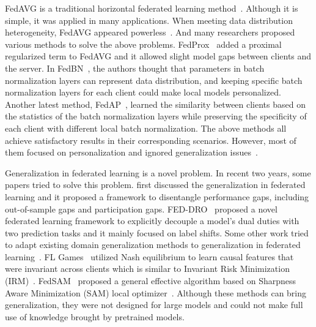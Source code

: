 FedAVG is a traditional horizontal federated learning method~\cite{Jindong-mcmahan2017communication}.
Although it is simple, it was applied in many applications.
When meeting data distribution heterogeneity, FedAVG appeared powerless~\cite{Jindong-sattler2019robust}.
And many researchers proposed various methods to solve the above problems.
FedProx~\cite{Jindong-li2018federated} added a proximal regularized term to FedAVG and it allowed slight model gaps between clients and the server.
In FedBN~\cite{Jindong-li2021fedbn}, the authors thought that parameters in batch normalization layers can represent data distribution, and keeping specific batch normalization layers for each client could make local models personalized.
Another latest method, FedAP~\cite{Jindong-lu2022personalized}, learned the similarity between clients based on the statistics of the batch normalization layers while preserving the specificity of each client with different local batch normalization.
The above methods all achieve satisfactory results in their corresponding scenarios.
However, most of them focused on personalization and ignored generalization issues~\cite{Jindong-chenbridging}.

Generalization in federated learning is a novel problem.
In recent two years, some papers tried to solve this problem.
\cite{Jindong-Honglinyuan2022} first discussed the generalization in federated learning and it proposed a framework to disentangle performance gaps, including out-of-sample gaps and participation gaps.
FED-DRO~\cite{Jindong-chenbridging} proposed a novel federated learning framework to explicitly decouple a model's dual duties with two prediction tasks and it mainly focused on label shifts.
Some other work tried to adapt existing domain generalization methods to generalization in federated learning~\cite{Jindong-gupta2022fl,Jindong-tenison2022gradient,Jindong-qu2022generalized,Jindong-caldarola2022improving}.
FL Games~\cite{Jindong-gupta2022fl} utilized Nash equilibrium to learn causal features that were invariant across clients which is similar to Invariant Risk Minimization (IRM)~\cite{Jindong-arjovsky2020invariant}.
FedSAM~\cite{Jindong-qu2022generalized} proposed a general effective algorithm based on Sharpness Aware Minimization (SAM) local optimizer~\cite{Jindong-foretsharpness}.
Although these methods can bring generalization, they were not designed for large models and could not make full use of knowledge brought by pretrained models.


